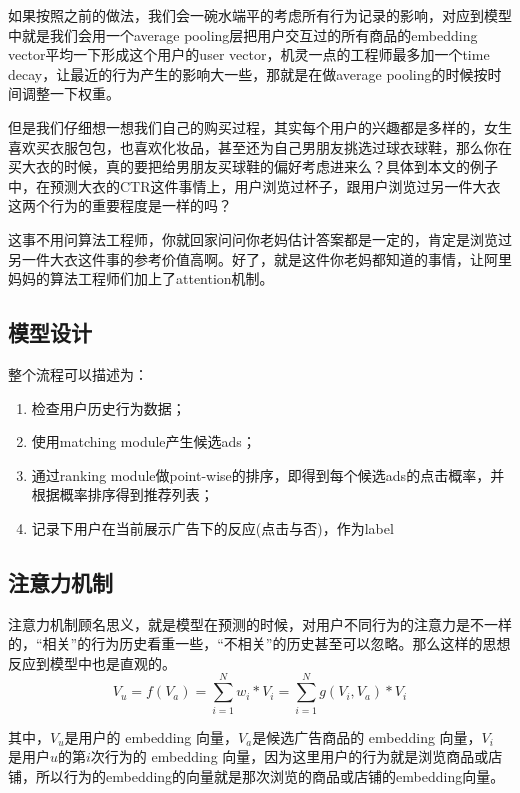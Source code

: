 \documentclass[12pt]{article}
\begin{document}
\begin{framed}
如果按照之前的做法，我们会一碗水端平的考虑所有行为记录的影响，对应到模型中就是我们会用一个average pooling层把用户交互过的所有商品的embedding vector平均一下形成这个用户的user vector，机灵一点的工程师最多加一个time decay，让最近的行为产生的影响大一些，那就是在做average pooling的时候按时间调整一下权重。

但是我们仔细想一想我们自己的购买过程，其实每个用户的兴趣都是多样的，女生喜欢买衣服包包，也喜欢化妆品，甚至还为自己男朋友挑选过球衣球鞋，那么你在买大衣的时候，真的要把给男朋友买球鞋的偏好考虑进来么？具体到本文的例子中，在预测大衣的CTR这件事情上，用户浏览过杯子，跟用户浏览过另一件大衣这两个行为的重要程度是一样的吗？

这事不用问算法工程师，你就回家问问你老妈估计答案都是一定的，肯定是浏览过另一件大衣这件事的参考价值高啊。好了，就是这件你老妈都知道的事情，让阿里妈妈的算法工程师们加上了attention机制。
\end{framed}

\subsection{模型设计\cite{Recommender_System_With_Deep_Learning_DIN}}
整个流程可以描述为：
\begin{enumerate}
\setlength{\itemsep}{0pt}
\setlength{\parsep}{0pt}
\setlength{\parskip}{0pt}
    \item 检查用户历史行为数据；
    \item 使用matching module产生候选ads；
    \item 通过ranking module做point-wise的排序，即得到每个候选ads的点击概率，并根据概率排序得到推荐列表；
    \item 记录下用户在当前展示广告下的反应(点击与否)，作为label
\end{enumerate}

\subsection{注意力机制}
注意力机制顾名思义，就是模型在预测的时候，对用户不同行为的注意力是不一样的，“相关”的行为历史看重一些，“不相关”的历史甚至可以忽略。那么这样的思想反应到模型中也是直观的。
$$
V_u  = f(V_a) = \sum_{i=1}^Nw_i * V_i = \sum_{i=1}^Ng(V_i, V_a) * V_i
$$

其中，$V_u$是用户的 embedding 向量，$V_a$是候选广告商品的 embedding 向量，$V_i$ 是用户$u$的第$i$次行为的 embedding 向量，因为这里用户的行为就是浏览商品或店铺，所以行为的embedding的向量就是那次浏览的商品或店铺的embedding向量。
\end{document}
